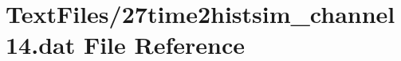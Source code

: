 \hypertarget{27time2histsim__channel14_8dat}{}\section{Text\+Files/27time2histsim\+\_\+channel14.dat File Reference}
\label{27time2histsim__channel14_8dat}
